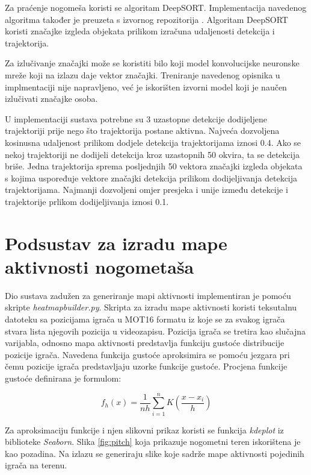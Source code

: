 \documentclass[times, utf8, seminar, numeric]{fer}
\begin{document}
Za praćenje nogomeša koristi se algoritam DeepSORT. 
Implementacija navedenog algoritma također je preuzeta s izvornog repozitorija \cite{Wojke2018deep}\cite{deepsort}. 
Algoritam DeepSORT koristi značajke izgleda objekata prilikom izračuna udaljenosti detekcija i trajektorija. 

Za izlučivanje značajki može se koristiti bilo koji model konvolucijske neuronske mreže koji na izlazu daje vektor značajki. Treniranje navedenog opisnika u implmentaciji nije napravljeno, već je iskorišten izvorni model koji je naučen izlučivati značajke osoba.

U implementaciji sustava potrebne su 3 uzastopne detekcije dodijeljene trajektoriji prije nego što trajektorija postane aktivna. Najveća dozvoljena kosinusna udaljenost prilikom dodjele detekcija trajektorijama iznosi 0.4. Ako se nekoj trajektoriji ne dodijeli detekcija kroz uzastopnih 50 okvira, ta se detekcija briše. Jedna trajektorija sprema posljednjih 50 vektora značajki izgleda objekata s kojima uspoređuje vektore značajki detekcija prilikom dodijeljivanja detekcija trajektorijama. Najmanji dozvoljeni omjer presjeka i unije između detekcije i trajektorije prlikom dodijeljivanja iznosi 0.1.  




\section{Podsustav za izradu mape aktivnosti nogometaša}

Dio sustava zadužen za generiranje mapi aktivnosti implementiran je pomoću skripte \textit{heatmap\textunderscore builder.py}.
Skripta za izradu mape aktivnosti koristi teksutalnu datoteku sa pozicijama igrača u MOT16 formatu iz koje se za svakog igrača stvara lista njegovih pozicija u videozapisu. 
Pozicija igrača se tretira kao slučajna varijabla, odnosno mapa aktivnosti predstavlja funkciju gustoće distribucije pozicije igrača. 
Navedena funkcija gustoće aproksimira se pomoću jezgara pri čemu pozicije igrača predstavljaju uzorke funkcije gustoće. 
Procjena funkcije gustoće definirana je formulom:

\[f_h(x) = \frac{1}{nh} \sum_{i=1}^{n} K( \frac{x - x_i}{h}) \]

Za aproksimaciju funkcije i njen slikovni prikaz koristi se funkcija \textit{kdeplot} iz biblioteke \textit{Seaborn}. Slika \ref{fig:pitch} koja prikazuje nogometni teren iskorištena je kao pozadina. 
Na izlazu se generiraju slike koje sadrže mape aktivnosti pojedinih igrača na terenu. 
\end{document}
